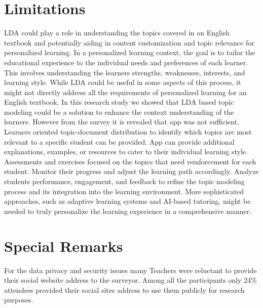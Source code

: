 \documentclass[sn-mathphys,Numbered]{sn-jnl}%
\theoremstyle{thmstyleone}%
\theoremstyle{thmstyletwo}%
\theoremstyle{thmstylethree}%
\begin{document}
\section{Limitations}\label{limitat}

LDA could play a role in understanding the topics covered in an English
textbook and potentially aiding in content customization and topic
relevance for personalized learning. In a personalized learning context,
the goal is to tailor the educational experience to the individual needs
and preferences of each learner. This involves understanding the
learner\textquotesingle s strengths, weaknesses, interests, and learning
style. While LDA could be useful in some aspects of this process, it
might not directly address all the requirements of personalized learning
for an English textbook. In this research study we showed that LDA based
topic modeling could be a solution to enhance the context understanding
of the learners. However from the survey it is revealed that app was not
sufficient. Learners oriented topic-document distribution to identify
which topics are most relevant to a specific student can be provided.
App can provide additional explanations, examples, or resources to cater
to their individual learning style. Assessments and exercises focused on
the topics that need reinforcement for each student. Monitor their
progress and adjust the learning path accordingly. Analyze
students\textquotesingle{} performance, engagement, and feedback to
refine the topic modeling process and its integration into the learning
environment. More sophisticated approaches, such as adaptive learning
systems and AI-based tutoring, might be needed to truly personalize the
learning experience in a comprehensive manner.

\section{Special Remarks}

For the data privacy and security issues many Teachers were reluctant to
provide their social website address to the surveyor. Among all the
participants only 24\% attendees provided their social sites address to
use them publicly for research purposes.
\end{document}
